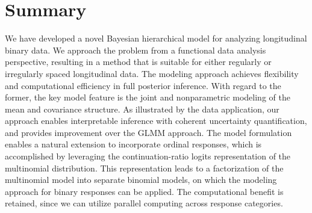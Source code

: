 \section{Summary}
\label{sec:summary}

We have developed a novel Bayesian hierarchical model for analyzing longitudinal binary 
data. We approach the problem from a functional data analysis perspective, resulting in 
a method that is suitable for either regularly or irregularly spaced longitudinal data. 
The modeling approach achieves flexibility and computational efficiency in full posterior 
inference. With regard to the former, the key model feature is the joint and nonparametric 
modeling of the mean and covariance structure. As illustrated by the data application, 
our approach enables interpretable inference with coherent uncertainty quantification, 
and provides improvement over the GLMM approach.  
The model formulation enables a natural extension to incorporate ordinal responses, 
which is accomplished by leveraging the continuation-ratio logits representation of 
the multinomial distribution. This representation leads to a factorization of the 
multinomial model into separate binomial models, on which the modeling approach for 
binary responses can be applied. The computational benefit is retained, since we can 
utilize parallel computing across response categories. 

 

%
%


